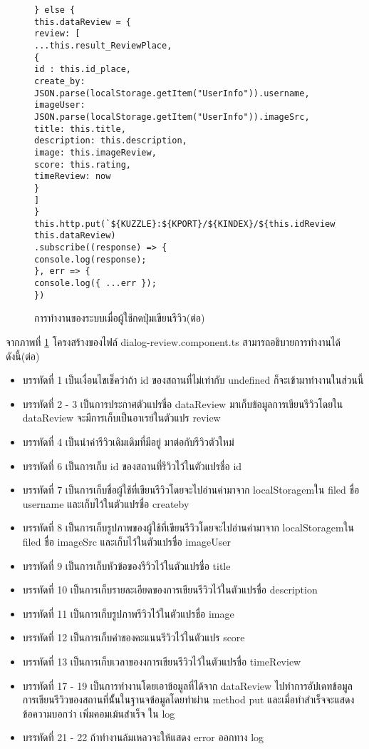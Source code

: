 \begin{figure}[H]
{\begin{lstlisting}
} else {
this.dataReview = {
review: [
...this.result_ReviewPlace,
{
id : this.id_place,
create_by: JSON.parse(localStorage.getItem("UserInfo")).username,
imageUser: JSON.parse(localStorage.getItem("UserInfo")).imageSrc,
title: this.title,
description: this.description,
image: this.imageReview,
score: this.rating,
timeReview: now
}
]
}
this.http.put(`${KUZZLE}:${KPORT}/${KINDEX}/${this.idReview}/${this.id_place}/_update`, this.dataReview)
.subscribe((response) => {
console.log(response);
}, err => {
console.log({ ...err });
})
\end{lstlisting}}
\caption{การทำงานของระบบเมื่อผู้ใช้กดปุ่มเขียนรีวิว(ต่อ)}
\label{Fig:4-review1}
\end{figure}
\newpage

จากภาพที่ \ref{Fig:4-review1} โครงสร้างของไฟล์ dialog-review.component.ts สามารถอธิบายการทำงานได้ดังนี้(ต่อ)
\begin{itemize}[label={--}]
\item บรรทัดที่ 1 เป็นเงื่อนไขเช็คว่าถ้า id ของสถานที่ไม่เท่ากับ undefined ก็จะเข้ามาทำงานในส่วนนี้
\item บรรทัดที่ 2 - 3 เป็นการประกาศตัวแปรชื่อ dataReview มาเก็บข้อมูลการเขียนรีวิวโดยใน dataReview จะมีการเก็บเป็นอาเรย์ในตัวแปร review
\item บรรทัดที่ 4 เป็นนำค่ารีวิวเดิมเดิมที่มีอยู่ มาต่อกับรีวิวตัวใหม่
\item บรรทัดที่ 6 เป็นการเก็บ id ของสถานที่รีวิวไว้ในตัวแปรชื่อ id
\item บรรทัดที่ 7 เป็นการเก็บชื่อผู้ใช้ที่เขียนรีวิวโดยจะไปอ่านค่ามาจาก localStoragemใน filed ชื่อ username และเก็บไว้ในตัวแปรชื่อ createby
\item บรรทัดที่ 8 เป็นการเก็บรูปภาพของผู้ใช้ที่เขียนรีวิวโดยจะไปอ่านค่ามาจาก localStoragemใน filed ชื่อ imageSrc และเก็บไว้ในตัวแปรชื่อ imageUser
\item บรรทัดที่ 9 เป็นการเก็บหัวข้อของรีวิวไว้ในตัวแปรชื่อ title
\item บรรทัดที่ 10 เป็นการเก็บรายละเอียดของการเขียนรีวิวไว้ในตัวแปรชื่อ description
\item บรรทัดที่ 11 เป็นการเก็บรูปภาพรีวิวไว้ในตัวแปรชื่อ image
\item บรรทัดที่ 12 เป็นการเก็บค่าของคะแนนรีวิวไว้ในตัวแปร score
\item บรรทัดที่ 13 เป็นการเก็บเวลาของงการเขียนรีวิวไว้ในตัวแปรชื่อ timeReview
\item บรรทัดที่ 17 - 19 เป็นการทำงานโดยเอาข้อมูลที่ได้จาก dataReview ไปทำการอัปเดทข้อมูลการเขียนรีวิวของสถานที่นั้้นในฐานจข้อมูลโดยทำผ่าน method put และเมื่อทำสำเร็จจะแสดงข้อความบอกว่า เพิ่มคอมเม้นสำเร็จ ใน log
\item บรรทัดที่ 21 - 22 ถ้าทำงานล้มเหลวจะให้แสดง error ออกทาง log
\end{itemize}
\newpage

